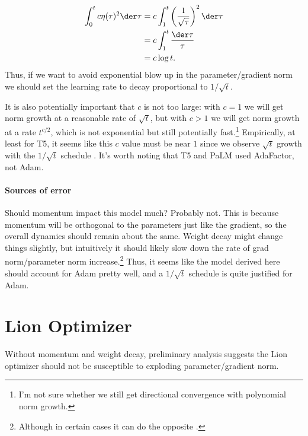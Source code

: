\documentclass{article}
\begin{document}
\begin{align*}
    \int_0^t c \eta(\tau)^2 \der \tau
    &= c \int_1^t \left(\frac{1}{\sqrt{\tau}}\right)^2 \der \tau \\
    &= c \int_1^t \frac{\der \tau}{\tau} \\
    &= c \log t .
\end{align*}
Thus, if we want to avoid exponential blow up in the parameter/gradient norm we should set the learning rate to decay proportional to $1/\sqrt{t}$.

It is also potentially important that $c$ is not too large: with $c = 1$ we will get norm growth at a reasonable rate of $\sqrt{t}$, but with $c > 1$ we will get norm growth at a rate $t^{c/2}$, which is not exponential but still potentially fast.\footnote{I'm not sure whether we still get directional convergence with polynomial norm growth.} Empirically, at least for T5, it seems like this $c$ value must be near $1$ since we observe $\sqrt{t}$ growth with the $1/\sqrt{t}$ schedule \citep{merrill2021effects}. It's worth noting that T5 and PaLM used AdaFactor, not Adam.

\paragraph{Sources of error} Should momentum impact this model much? Probably not. This is because momentum will be orthogonal to the parameters just like the gradient, so the overall dynamics should remain about the same. Weight decay might change things slightly, but intuitively it should likely slow down the rate of grad norm/parameter norm increase.\footnote{Although in certain cases it can do the opposite \citep{li2019exponential}.} Thus, it seems like the model derived here should account for Adam pretty well, and a $1/\sqrt{t}$ schedule is quite justified for Adam.

\section{Lion Optimizer}

Without momentum and weight decay, preliminary analysis suggests the Lion optimizer should not be susceptible to exploding parameter/gradient norm.


\end{document}
